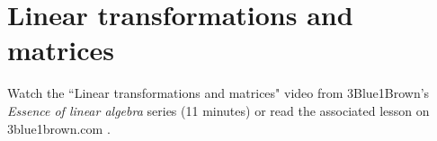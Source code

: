 \section{Linear transformations and matrices}

Watch the ``Linear transformations and matrices" video from 3Blue1Brown's
\textit{Essence of linear algebra} series (11 minutes) or read the associated
lesson on 3blue1brown.com
\cite{bib:3b1b_linalg_linear_transformations_and_matrices}.
